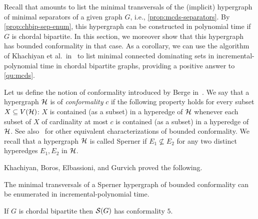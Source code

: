 Recall that \cdomenum{} amounts to list the minimal transversals of the (implicit) hypergraph of minimal separators of a given graph $G$, i.e., \autoref{prop:mcds-separators}.
By \autoref{prop:chbip-sep-enum}, this hypergraph can be constructed in polynomial time if $G$ is chordal bipartite.
%
In this section, we moreover show that this hypergraph has bounded conformality in that case. 
As a corollary, we can use the algorithm of Khachiyan et al.~in~\cite{khachiyan2007conformality} to list minimal connected dominating sets in incremental-polynomial time in chordal bipartite graphs, providing a positive answer to \autoref{qu:mcds}.

Let us define the notion of conformality introduced by Berge in~\cite{berge1984hypergraphs}. 
We say that a hypergraph $\H$ is of \emph{conformality} $c$ if the following property holds for every subset $X\subseteq V(\H)$: $X$ is contained (as a subset) in a hyperedge of $\H$ whenever each subset of $X$ of cardinality at most $c$ is contained (as a subset) in a hyperedge of $\H$. 
See also~\cite{berge1984hypergraphs,khachiyan2007conformality} for other equivalent characterizations of bounded conformality.
We recall that a hypergraph $\H$ is called Sperner if $E_1\not\subseteq E_2$ for any two distinct hyperedges $E_1,E_2$ in $\H$.

Khachiyan, Boros, Elbassioni, and Gurvich proved the following.

\begin{theorem}\label{theorem:conformality}
    The minimal transversals of a Sperner hypergraph of bounded conformality can be enumerated in incre\-mental-poly\-nomial time.
\end{theorem}


\begin{lemma}\label{lemma:conf}
    If $G$ is chordal bipartite then $\S(G)$ has conformality $5$.
\end{lemma}

